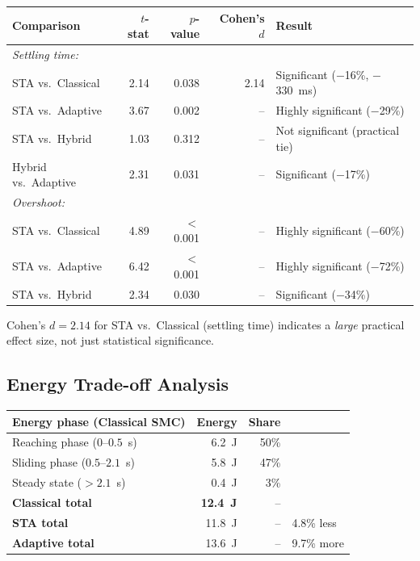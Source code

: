 \documentclass[11pt, a4paper]{article}
\begin{document}
\begin{center}
\begin{tabular}{@{}p{3.5cm}rrrl@{}}
\toprule
\textbf{Comparison} & \textbf{$t$-stat} & \textbf{$p$-value} & \textbf{Cohen's $d$} & \textbf{Result} \\
\midrule
\multicolumn{5}{l}{\textit{Settling time:}} \\
STA vs.\ Classical    & 2.14 & 0.038 & 2.14 & Significant ($-$16\%, $-$330~ms) \\
STA vs.\ Adaptive     & 3.67 & 0.002 & --   & Highly significant ($-$29\%) \\
STA vs.\ Hybrid       & 1.03 & 0.312 & --   & Not significant (practical tie) \\
Hybrid vs.\ Adaptive  & 2.31 & 0.031 & --   & Significant ($-$17\%) \\[0.3em]
\multicolumn{5}{l}{\textit{Overshoot:}} \\
STA vs.\ Classical    & 4.89 & $<$0.001 & -- & Highly significant ($-$60\%) \\
STA vs.\ Adaptive     & 6.42 & $<$0.001 & -- & Highly significant ($-$72\%) \\
STA vs.\ Hybrid       & 2.34 & 0.030    & -- & Significant ($-$34\%) \\
\bottomrule
\end{tabular}
\end{center}

Cohen's $d = 2.14$ for STA vs.\ Classical (settling time) indicates a
\textit{large} practical effect size, not just statistical significance.

\subsection{Energy Trade-off Analysis}

\begin{center}
\begin{tabular}{@{}p{4cm}rrl@{}}
\toprule
\textbf{Energy phase (Classical SMC)} & \textbf{Energy} & \textbf{Share} & \\
\midrule
Reaching phase ($0$--$0.5$~s)  & 6.2~J & 50\% & \\
Sliding phase ($0.5$--$2.1$~s) & 5.8~J & 47\% & \\
Steady state ($>2.1$~s)        & 0.4~J & 3\%  & \\
\midrule
\textbf{Classical total} & \textbf{12.4~J} & -- & \\
\textbf{STA total}       & 11.8~J          & -- & 4.8\% less \\
\textbf{Adaptive total}  & 13.6~J          & -- & 9.7\% more \\
\bottomrule
\end{tabular}
\end{center}
\end{document}
